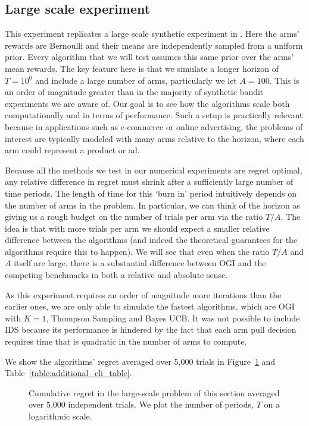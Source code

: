 \subsection{Large scale experiment} \label{exp:ts_sampling_experiment}
This experiment replicates a large scale synthetic experiment in \cite{chapelle2011empirical}.
{\color{blue}Here the arms' rewards are Bernoulli and their means are independently sampled from a uniform prior. Every algorithm that we will test assumes this same prior over the arms' mean rewards.}
The key feature here is that we simulate a  longer horizon of $T = 10^6$ and include a large number of arms, particularly we let $A = 100$. This is an order of magnitude greater than in the majority of synthetic bandit experiments we are aware of.
Our goal is to see how the algorithms scale both computationally and in terms of performance.
Such a setup is practically relevant because in applications such as e-commerce or online advertising, the problems of interest are typically modeled with many arms relative to the horizon, where each arm could represent a product or ad.

Because all the methods we test in our numerical experiments are regret optimal, any relative difference in regret must shrink after a sufficiently large number of time periods. The length of time for this `burn in' period intuitively depends on the number of arms in the problem.
In particular, we can think of the horizon as giving us a rough budget on the number of trials per arm via the ratio $T/A$.
The idea is that with more trials per arm we should expect a smaller relative difference between the algorithms {(and indeed the theoretical guarantees for the algorithms require this to happen)}. 
We will see that even when the ratio $T/A$ and $A$ itself are large, there is a substantial difference between OGI and the competing benchmarks in both a relative and absolute sense.

As this experiment requires an order of magnitude more iterations than the earlier ones, we are only able to simulate the fastest algorithms, which are OGI with $K=1$, Thompson Sampling and Bayes UCB. 
It was not possible to include IDS because its performance is hindered by the fact that each arm pull decision requires time that is quadratic in the number of arms to compute. 

We show the algorithms' regret averaged over 5,000 trials in Figure~\ref{fig:chapelle_and_li} and Table~\ref{table:additional_cli_table}.
\begin{figure}[h!]
	\centering
	
	\caption{Cumulative regret in the large-scale problem of this section averaged over 5,000 independent trials.
		We plot the number of periods, $T$ on a logarithmic scale.}
	\label{fig:chapelle_and_li}
\end{figure}

